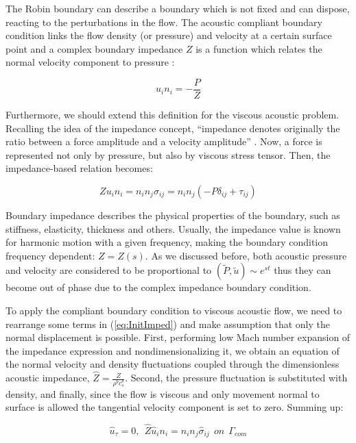 The Robin boundary can describe a boundary which is not fixed and can dispose, reacting to the perturbations in the flow. The acoustic compliant boundary condition links the flow density (or pressure) and velocity at a certain surface point and a complex boundary impedance $Z$ is a function which relates the normal velocity component to pressure \cite{Myers1980}:

\begin{equation}
\label{eq:InitImpedAcoustic}
u_i n_i = - \frac{P}{Z}
\end{equation}

Furthermore, we should extend this definition for the viscous acoustic problem. Recalling the idea of the impedance concept, \enquote{impedance denotes originally the ratio between a force amplitude and a velocity amplitude} \cite{rienstra}. Now, a force is represented not only by pressure, but also by viscous stress tensor. Then, the impedance-based relation becomes:

\begin{equation}
\label{eq:InitImped}
Z u_i n_i = n_i n_j \sigma_{ij} =  n_i n_j (-P \delta_{ij} + \tau_{ij})
\end{equation}

Boundary impedance describes the physical properties of the boundary, such as stiffness, elasticity, thickness and others. Usually, the impedance value is known for harmonic motion with a given frequency, making the boundary condition frequency dependent: $Z = Z(s)$. As we discussed before, both acoustic pressure and velocity are considered to be proportional to $(\tilde{P}, \tilde{u}) \sim e^{st}$ thus they can become out of phase due to the complex impedance boundary condition.

To apply the compliant boundary condition to viscous acoustic flow, we need to rearrange some terms in (\ref{eq:InitImped}) and make assumption that only the normal displacement is possible. First, performing low Mach number expansion of the impedance expression and nondimensionalizing it, we obtain an equation of the normal velocity and density fluctuations coupled through the dimensionless acoustic impedance, $\hat{Z} = \frac{Z}{\rho^b c_s^b}$. Second, the pressure fluctuation is substituted with density, and finally, since the flow is viscous and only movement normal to surface is allowed the tangential velocity component is set to zero. Summing up:

\begin{equation}
\label{eq:BCCompl}
\hat{u}_{\tau} = 0, \ \ \hat{Z} \hat{u}_i n_i = n_i n_j \hat{\sigma}_{ij} \ \ on \ \ \Gamma_{com}
\end{equation}

